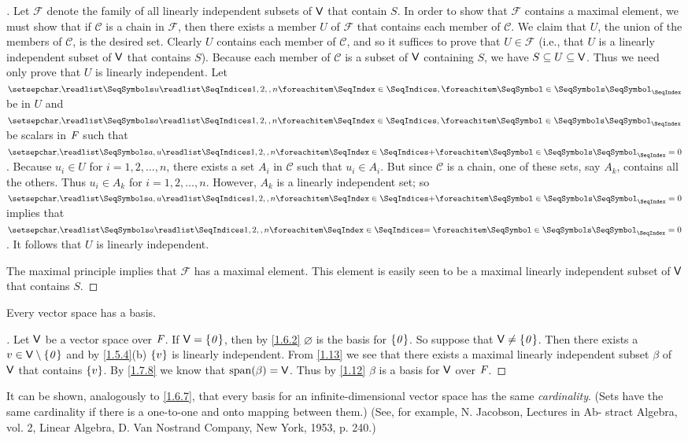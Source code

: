 \begin{proof}[]
  Let \(\mathcal{F}\) denote the family of all linearly independent subsets of \(\mathsf{V}\) that contain \(S\).
  In order to show that \(\mathcal{F}\) contains a maximal element, we must show that if \(\mathcal{C}\) is a chain in \(\mathcal{F}\), then there exists a member \(U\) of \(\mathcal{F}\) that contains each member of \(\mathcal{C}\).
  We claim that \(U\), the union of the members of \(\mathcal{C}\), is the desired set.
  Clearly \(U\) contains each member of \(\mathcal{C}\), and so it suffices to prove that \(U \in \mathcal{F}\)
  (i.e., that \(U\) is a linearly independent subset of \(\mathsf{V}\) that contains \(S\)).
  Because each member of \(\mathcal{C}\) is a subset of \(\mathsf{V}\) containing \(S\), we have \(S \subseteq U \subseteq \mathsf{V}\).
  Thus we need only prove that \(U\) is linearly independent.
  Let \(\seq{u}{1,2,,n}\) be in \(U\) and \(\seq{a}{1,2,,n}\) be scalars in \(\mathit{F}\) such that \(\seq[+]{a,u}{1,2,,n} = 0\).
  Because \(u_i \in U\) for \(i = 1, 2, \dots, n\), there exists a set \(A_i\) in \(\mathcal{C}\) such that \(u_i \in A_i\).
  But since \(\mathcal{C}\) is a chain, one of these sets, say \(A_k\), contains all the others.
  Thus \(u_i \in A_k\) for \(i = 1, 2, \dots, n\).
  However, \(A_k\) is a linearly independent set;
  so \(\seq[+]{a,u}{1,2,,n} = 0\) implies that \(\seq[=]{a}{1,2,,n} = 0\).
  It follows that \(U\) is linearly independent.

  The maximal principle implies that \(\mathcal{F}\) has a maximal element.
  This element is easily seen to be a maximal linearly independent subset of \(\mathsf{V}\) that contains \(S\).
\end{proof}

\begin{cor}\label{1.7.10}
  Every vector space has a basis.
\end{cor}

\begin{proof}[]
  Let \(\mathsf{V}\) be a vector space over \(\mathit{F}\).
  If \(\mathsf{V} = \left\lbrace\mathit{0}\right\rbrace\), then by \cref{1.6.2} \(\varnothing\) is the basis for \(\left\lbrace\mathit{0}\right\rbrace\).
  So suppose that \(\mathsf{V} \neq \left\lbrace\mathit{0}\right\rbrace\).
  Then there exists a \(v \in \mathsf{V} \setminus \left\lbrace\mathit{0}\right\rbrace\) and by \cref{1.5.4}(b) \(\left\lbrace v\right\rbrace\) is linearly independent.
  From \cref{1.13} we see that there exists a maximal linearly independent subset \(\beta\) of \(\mathsf{V}\) that contains \(\left\lbrace v\right\rbrace\).
  By \cref{1.7.8} we know that \(\spn{\beta} = \V\).
  Thus by \cref{1.12} \(\beta\) is a basis for \(\mathsf{V}\) over \(\mathit{F}\).
\end{proof}

\begin{note}
  It can be shown, analogously to \cref{1.6.7}, that every basis for an infinite-dimensional vector space has the same \emph{cardinality}.
  (Sets have the same cardinality if there is a one-to-one and onto mapping between them.)
  (See, for example, N. Jacobson, Lectures in Ab- stract Algebra, vol. 2, Linear Algebra, D. Van Nostrand Company, New York, 1953, p. 240.)
\end{note}

\exercisesection

